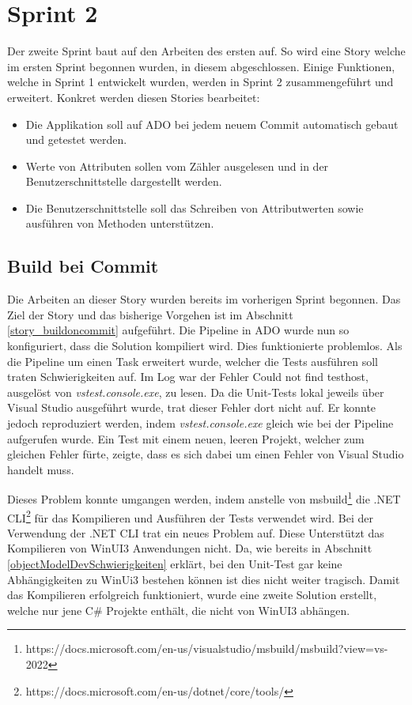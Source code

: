 \section{Sprint 2}
Der zweite Sprint baut auf den Arbeiten des ersten auf.
So wird eine Story welche im ersten Sprint begonnen wurden, in diesem abgeschlossen.
Einige Funktionen, welche in Sprint 1 entwickelt wurden, werden in Sprint 2 zusammengeführt und erweitert.
Konkret werden diesen Stories bearbeitet:
\begin{itemize}
   \item Die Applikation soll auf \ac{ADO} bei jedem neuem Commit automatisch gebaut und getestet werden. 
   \item Werte von Attributen sollen vom Zähler ausgelesen und in der Benutzerschnittstelle dargestellt werden.
   \item Die Benutzerschnittstelle soll das Schreiben von Attributwerten sowie ausführen von Methoden unterstützen.
\end{itemize}


\subsection{Build bei Commit}\label{s2:buildOnCommit}
Die Arbeiten an dieser Story wurden bereits im vorherigen Sprint begonnen.
Das Ziel der Story und das bisherige Vorgehen ist im Abschnitt \ref{story_buildoncommit} aufgeführt.
Die Pipeline in \ac{ADO} wurde nun so konfiguriert, dass die Solution kompiliert wird.
Dies funktionierte problemlos.
Als die Pipeline um einen Task erweitert wurde, welcher die Tests ausführen soll traten Schwierigkeiten auf.
Im Log war der Fehler \dq  Could not find testhost\dq , ausgelöst von \textit{vstest.console.exe}, zu lesen.
Da die Unit-Tests lokal jeweils über Visual Studio ausgeführt wurde, trat dieser Fehler dort nicht auf.
Er konnte jedoch reproduziert werden, indem \textit{vstest.console.exe} gleich wie bei der Pipeline aufgerufen wurde.
Ein Test mit einem neuen, leeren Projekt, welcher zum gleichen Fehler fürte, zeigte, dass es sich dabei um einen Fehler von Visual Studio handelt muss.

Dieses Problem konnte umgangen werden, indem anstelle von msbuild\footnote{https://docs.microsoft.com/en-us/visualstudio/msbuild/msbuild?view=vs-2022}
die .NET CLI\footnote{https://docs.microsoft.com/en-us/dotnet/core/tools/} für das Kompilieren und Ausführen der Tests verwendet wird.
Bei der Verwendung der .NET CLI trat ein neues Problem auf.
Diese Unterstützt das Kompilieren von WinUI3 Anwendungen nicht.
Da, wie bereits in Abschnitt \ref{objectModelDevSchwierigkeiten} erklärt, bei den Unit-Test gar keine Abhängigkeiten zu WinUi3 bestehen können ist dies nicht weiter tragisch.
Damit das Kompilieren erfolgreich funktioniert, wurde eine zweite Solution erstellt, welche nur jene C\# Projekte enthält, die nicht von WinUI3 abhängen.

